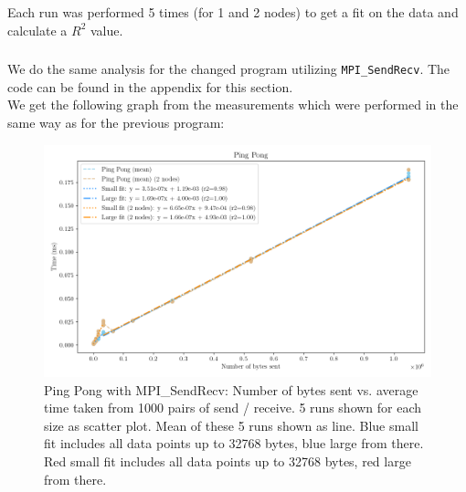  Each run was performed 5 times (for 1 and 2 nodes) to get a fit on the data and calculate a $R^2$ value. 

\subsubsection*{}
We do the same analysis for the changed program utilizing \texttt{MPI\_SendRecv}. The code can be found in the appendix for this section. \\
We get the following graph from the measurements which were performed in the same way as for the previous program:
\begin{figure}[H]
    \centering
    \includegraphics[width=\textwidth]{../fig/lab0/pingPongSR.png}
    \caption{Ping Pong with MPI\_SendRecv: Number of bytes sent vs. average time taken from 1000 pairs of send / receive. 5 runs shown for each size as scatter plot. Mean of these 5 runs shown as line. Blue small fit includes all data points up to 32768 bytes, blue large from there. Red small fit includes all data points up to 32768 bytes, red large from there.}
    \label{fig:pingpongSendRecv}
\end{figure}

